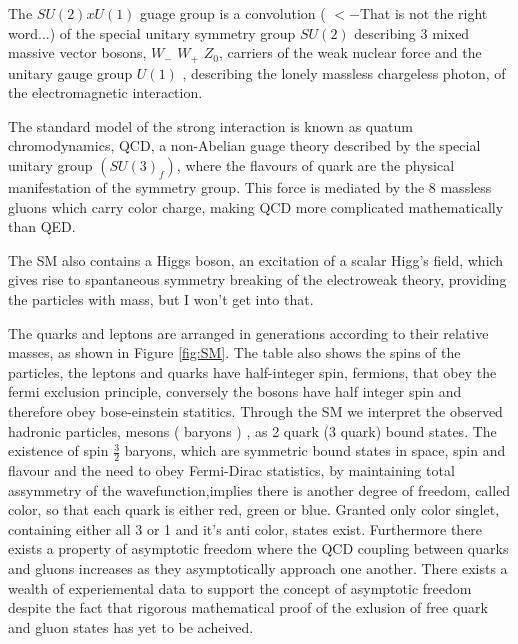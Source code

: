 The  $SU(2) x U(1)$ guage group is a convolution ( $<- $That is not the right word...) of the special unitary symmetry group $SU(2)$ describing 3 mixed massive vector bosons, $W_{-}$ $W_{+}$ $Z_0$, carriers of the weak nuclear force and the unitary gauge group $U(1)$ , describing the lonely massless chargeless photon, of the electromagnetic interaction.

The standard model of the strong interaction is known as quatum chromodynamics, QCD, a non-Abelian guage theory described by the special unitary group $(SU(3)_f)$, where the  flavours of quark are the physical manifestation of the symmetry group. This force is mediated by the 8 massless gluons which carry color charge, making QCD more complicated mathematically than QED.

The SM also contains a Higgs boson, an excitation of a scalar Higg's field, which gives rise to spantaneous symmetry breaking of the electroweak theory, providing the particles with mass, but I won't get into that. 

The quarks and leptons are arranged in generations according to their relative masses, as shown in Figure \ref{fig:SM}. The table also shows the spins of the particles, the leptons and quarks have half-integer spin, fermions, that obey the fermi exclusion principle, conversely the bosons have half integer spin and therefore obey bose-einstein statitics. Through the SM we interpret the observed hadronic particles, mesons ( baryons ) , as 2 quark (3 quark) bound states. The existence of spin $\frac{3}{2}$ baryons, which are symmetric bound states in space, spin and flavour and the need to obey Fermi-Dirac statistics, by maintaining total assymmetry of the wavefunction,implies there is another degree of freedom, called color, so that each quark is either red, green or blue. Granted only color singlet, containing either all 3 or 1 and it's anti color, states exist. Furthermore there exists a property of asymptotic freedom where the QCD coupling between quarks and gluons increases as they asymptotically approach one another. There exists a wealth of experiemental data to support the concept of asymptotic freedom despite the fact that rigorous mathematical proof of the exlusion of free quark and gluon states has yet to be acheived.




